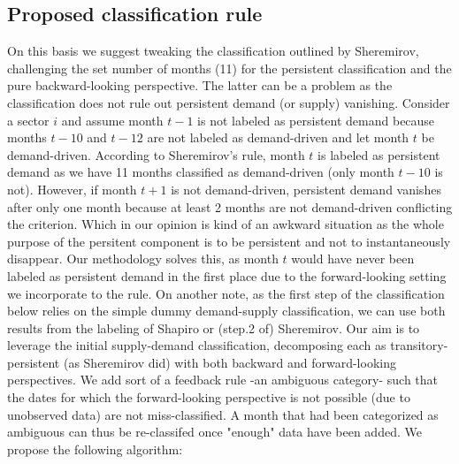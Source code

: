 \subsection{Proposed classification rule}

\quad On this basis we suggest tweaking the classification outlined by Sheremirov, challenging the set number of months (11) for the persistent classification and the pure backward-looking perspective. 
\bigbreak
The latter can be a problem as the classification does not rule out persistent demand (or supply) vanishing. 
Consider a sector $i$ and assume month $t-1$ is not labeled as persistent demand because months $t-10$ and $t-12$ are not labeled as demand-driven and let month $t$ be demand-driven. 
According to Sheremirov's rule, month $t$ is labeled as persistent demand as we have 11 months classified as demand-driven (only month $t-10$ is not).
However, if month $t+1$ is not demand-driven, persistent demand vanishes after only one month because at least 2 months are not demand-driven conflicting the criterion.
Which in our opinion is kind of an awkward situation as the whole purpose of the persitent component is to be persistent and not to instantaneously disappear. 
Our methodology solves this, as month $t$ would have never been labeled as persistent demand in the first place due to the forward-looking setting we incorporate to the rule.
\bigbreak
On another note, as the first step of the classification below relies on the simple dummy demand-supply classification, we can use both results from the labeling of Shapiro or (step.2 of) Sheremirov.
Our aim is to leverage the initial supply-demand classification, decomposing each as transitory-persistent (as Sheremirov did) with both backward and forward-looking perspectives.
We add sort of a feedback rule -an ambiguous category- such that the dates for which the forward-looking perspective is not possible (due to unobserved data) are not miss-classified.
A month that had been categorized as ambiguous can thus be re-classifed once "enough" data have been added.
\bigbreak
We propose the following algorithm:
